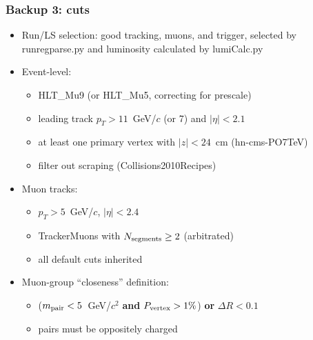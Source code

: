 \documentclass[compress]{beamer}
\newcommand{\s}[1]{{\mbox{\scriptsize #1}}}
\begin{document}
\begin{frame}
\frametitle{Backup 3: cuts}
\begin{itemize}
\item Run/LS selection: good tracking, muons, and trigger, selected by
  runregparse.py and luminosity calculated by lumiCalc.py

\item Event-level:
\begin{itemize}\setlength{\itemsep}{0.1 cm}
\item HLT\_Mu9 (or HLT\_Mu5, correcting for prescale)
\item leading track $p_T > 11$~GeV/$c$ (or 7) and $|\eta| < 2.1$
\item at least one primary vertex with $|z| < 24$~cm (hn-cms-PO7TeV)
\item filter out scraping (Collisions2010Recipes)
\end{itemize}

\item Muon tracks:
\begin{itemize}\setlength{\itemsep}{0.1 cm}
\item $p_T > 5$~GeV/$c$, $|\eta| < 2.4$
\item TrackerMuons with $N_\s{segments} \ge 2$ (arbitrated)
\item all default cuts inherited
\end{itemize}

\item Muon-group ``closeness'' definition:
\begin{itemize}\setlength{\itemsep}{0.1 cm}
\item ($m_\s{pair} < 5$~GeV/$c^2$ {\bf and} $P_\s{vertex} > 1\%$) {\bf or} $\Delta R < 0.1$
\item pairs must be oppositely charged
\end{itemize}
\end{itemize}
\end{frame}
\end{document}
